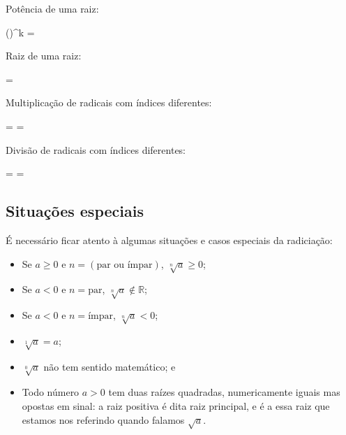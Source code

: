 \documentclass[pdftex, brazil, 12pt, oneside]{article}
\begin{document}
\newpage
Potência de uma raiz:
\begin{tcolorbox}
  \label{eqn:pot_raiz}
  \left(\right)^k = 
\end{tcolorbox}

Raiz de uma raiz:
\begin{tcolorbox}
  \label{eqn:raiz_raiz}
   = 
\end{tcolorbox}

Multiplicação de radicais com índices diferentes:
\begin{tcolorbox}
  \label{eqn:mult_raiz_indice_diferente}
   \times {} =  \times {} = 
\end{tcolorbox}

Divisão de radicais com índices diferentes:
\begin{tcolorbox}
  \label{eqn:div_raiz_indice_diferente}
   =
   =
\end{tcolorbox}


\subsection{Situações especiais}
\label{radiciacao-especiais}

É necessário ficar atento à algumas situações e casos especiais da
radiciação:

\begin{itemize}
  \item Se $a \ge 0$ e $n = (\text{par ou ímpar})$, $\sqrt[n]{a} \ge 0$;
  \item Se $a < 0$ e $n = \text{par}$, $\sqrt[n]{a} \notin \mathbb{R}$;
  \item Se $a < 0$ e $n = \text{ímpar}$, $\sqrt[n]{a} < 0$;
    \item $\sqrt[1]{a} = a$;
  \item $\sqrt[0]{a}$ não tem sentido matemático; e
    \item Todo número $a > 0$ tem duas raízes quadradas, numericamente
      iguais mas opostas em sinal: a raiz positiva é dita raiz
      principal, e é a essa raiz que estamos nos referindo quando
      falamos $\sqrt{a}$.
\end{itemize}
\end{document}
